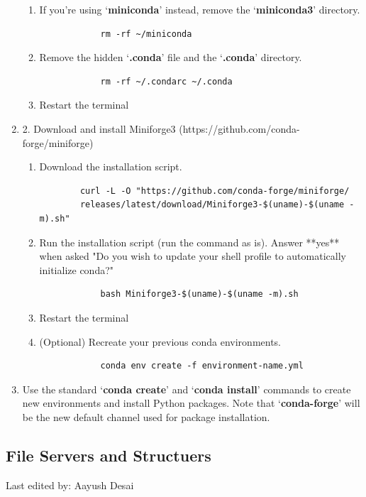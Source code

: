 \documentclass{article}
\newcommand{\setlasteditor}[1]{\gdef\lasteditor{#1}}
\newcommand{\lastedited}{%
    \vspace{1mm} {\footnotesize Last edited by: \lasteditor} \vspace{3mm}
    \newline

}
\begin{document}
\begin{enumerate}
\begin{enumerate}
        \item If you're using `\textbf{miniconda}' instead, remove the `\textbf{miniconda3}' directory.
        \begin{verbatim}
            rm -rf ~/miniconda
        \end{verbatim}
        \item Remove the hidden `\textbf{.conda}' file and the `\textbf{.conda}' directory.
        \begin{verbatim}
            rm -rf ~/.condarc ~/.conda
        \end{verbatim}
        \item Restart the terminal
    \end{enumerate}
    \item 2. Download and install Miniforge3 (https://github.com/conda-forge/miniforge)
    \begin{enumerate}
        \item Download the installation script.
        \begin{verbatim}
        curl -L -O "https://github.com/conda-forge/miniforge/
        releases/latest/download/Miniforge3-$(uname)-$(uname -m).sh"
        \end{verbatim}
        \item Run the installation script (run the command as is). Answer **yes** when asked "Do you wish to update your shell profile to automatically initialize conda?"
        \begin{verbatim}
            bash Miniforge3-$(uname)-$(uname -m).sh
        \end{verbatim}
        \item Restart the terminal
        \item (Optional) Recreate your previous conda environments.
        \begin{verbatim}
            conda env create -f environment-name.yml
        \end{verbatim}
    \end{enumerate}
    \item Use the standard `\textbf{conda create}' and `\textbf{conda install}' commands to create new environments and install Python packages. Note that `\textbf{conda-forge}' will be the new default channel used for package installation.
\end{enumerate}

\subsection{File Servers and Structuers}
\setlasteditor{Aayush Desai}
\lastedited
\end{document}
